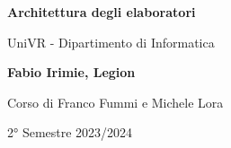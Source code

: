 \begin{titlepage}
	\begin{center}
		\vspace*{1cm}

		\Huge
		\textbf{Architettura degli elaboratori}

		\vspace{0.5cm}
		\LARGE
		UniVR - Dipartimento di Informatica

		\vspace{1.5cm}

		\textbf{Fabio Irimie, Legion}

		\vfill


		\vspace{0.8cm}

    Corso di Franco Fummi e Michele Lora

		2° Semestre 2023/2024

	\end{center}
\end{titlepage}
